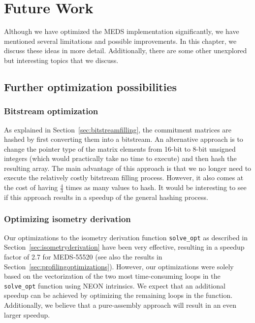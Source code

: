 \documentclass[11pt,a4paper]{report}
\theoremstyle{definition}
\begin{document}
\chapter{Future Work}
\label{ch:futurework}
Although we have optimized the MEDS implementation significantly, we have mentioned several limitations and possible improvements. In this chapter, we discuss these ideas in more detail. Additionally, there are some other unexplored but interesting topics that we discuss.

\section{Further optimization possibilities}
\label{sec:futureworkopt}

\subsection*{Bitstream optimization}
As explained in Section~\ref{sec:bitstreamfilling}, the commitment matrices are hashed by first converting them into a bitstream. An alternative approach is to change the pointer type of the matrix elements from 16-bit to 8-bit unsigned integers (which would practically take no time to execute) and then hash the resulting array. The main advantage of this approach is that we no longer need to execute the relatively costly bitstream filling process. However, it also comes at the cost of having $\frac{4}{3}$ times as many values to hash. It would be interesting to see if this approach results in a speedup of the general hashing process.

\subsection*{Optimizing isometry derivation}
Our optimizations to the isometry derivation function \texttt{solve\_opt} as described in Section~\ref{sec:isometryderivation} have been very effective, resulting in a speedup factor of 2.7 for MEDS-55520 (see also the results in Section~\ref{sec:profilingoptimizations}). However, our optimizations were solely based on the vectorization of the two most time-consuming loops in the \texttt{solve\_opt} function using NEON intrinsics. We expect that an additional speedup can be achieved by optimizing the remaining loops in the function. Additionally, we believe that a pure-assembly approach will result in an even larger speedup.
\end{document}
